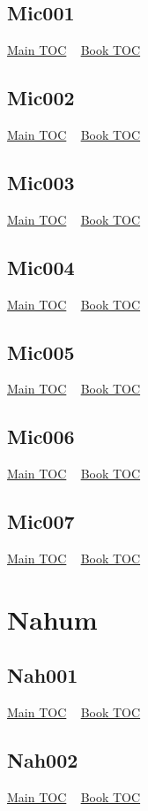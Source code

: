 \documentclass{book}
\begin{document}
  \section{Mic001}\hyperlink{toc}{Main TOC} ~ \hyperref[subsec:Mic]{Book TOC} 
  \section{Mic002}\hyperlink{toc}{Main TOC} ~ \hyperref[subsec:Mic]{Book TOC} 
  \section{Mic003}\hyperlink{toc}{Main TOC} ~ \hyperref[subsec:Mic]{Book TOC} 
  \section{Mic004}\hyperlink{toc}{Main TOC} ~ \hyperref[subsec:Mic]{Book TOC} 
  \section{Mic005}\hyperlink{toc}{Main TOC} ~ \hyperref[subsec:Mic]{Book TOC} 
  \section{Mic006}\hyperlink{toc}{Main TOC} ~ \hyperref[subsec:Mic]{Book TOC} 
  \section{Mic007}\hyperlink{toc}{Main TOC} ~ \hyperref[subsec:Mic]{Book TOC} 
  \chapter{Nahum} \label{subsec:Nah} \begin{multicols}{2} \minitoc \end{multicols}
  \section{Nah001}\hyperlink{toc}{Main TOC} ~ \hyperref[subsec:Nah]{Book TOC} 
  \section{Nah002}\hyperlink{toc}{Main TOC} ~ \hyperref[subsec:Nah]{Book TOC} 
\end{document}
